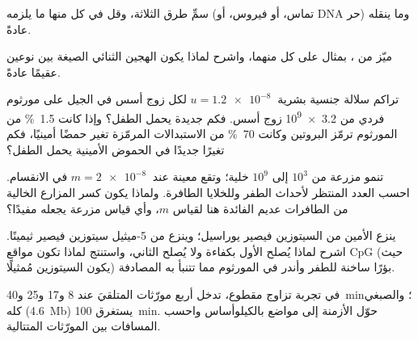 \begin{exercise}[$\star$]\label{exo:b2:genome-diversification:3}
سمِّ طرق  الثلاثة، وقل في كل منها ما يلزمه
(تماس، أو فيروس، أو DNA حر) وما ينقله عادةً.
\end{exercise}

\begin{exercise}[$\star$]\label{exo:b2:genome-diversification:4}
ميّز  من ، بمثال على كل منهما،
واشرح لماذا يكون الهجين الثنائي الصيغة بين نوعين عقيمًا عادةً.
\end{exercise}

\begin{exercise}[$\star\star$]\label{exo:b2:genome-diversification:5}
تراكم سلالة جنسية بشرية $u = \qty{1.2e-8}{}$  لكل زوج أسس في
الجيل على مورثوم فردي من \qty{3.2e9}{} زوج أسس. فكم  جديدة يحمل
الطفل؟ وإذا كانت \qty{1.5}{\%} من المورثوم ترمّز البروتين وكانت
\qty{70}{\%} من الاستبدالات المرمّزة تغير حمضًا أمينيًا، فكم تغيرًا
جديدًا في الحموض الأمينية يحمل الطفل؟
\end{exercise}

\begin{exercise}[$\star\star$]\label{exo:b2:genome-diversification:6}
تنمو مزرعة من $10^{3}$ إلى $10^{9}$ خلية؛ وتقع  معينة عند
$m = \qty{2e-8}{}$ في الانقسام. احسب العدد المنتظر لأحداث الطفر
وللخلايا الطافرة. ولماذا يكون كسر المزارع الخالية من الطافرات عديم
الفائدة هنا لقياس $m$، وأي قياس مزرعة يجعله مفيدًا؟
\end{exercise}

\begin{exercise}[$\star\star$]\label{exo:b2:genome-diversification:7}
ينزع الأمين من السيتوزين فيصير يوراسيل؛ وينزع من 5-ميثيل سيتوزين
فيصير ثيمينًا. اشرح لماذا يُصلح الأول بكفاءة ولا يُصلح الثاني،
واستنتج لماذا تكون مواقع CpG (حيث يكون السيتوزين مُمثيلًا) بؤرًا
ساخنة للطفر وأندر في المورثوم مما تتنبأ به المصادفة.
\end{exercise}

\begin{exercise}[$\star\star$]\label{exo:b2:genome-diversification:8}
في تجربة تزاوج مقطوع، تدخل أربع مورّثات المتلقيَ عند 8 و17 و25
و\qty{40}{min}؛ والصبغي كله (\qty{4.6}{Mb}) يستغرق \qty{100}{min}.
حوّل الأزمنة إلى مواضع بالكيلوأساس واحسب المسافات بين المورّثات
المتتالية.
\end{exercise}

